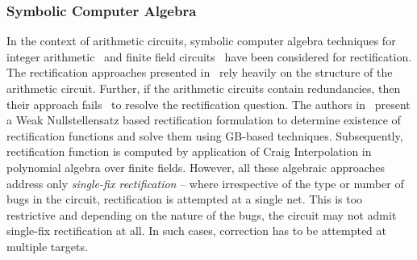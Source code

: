 \subsubsection{Symbolic Computer Algebra}
{\red
In the context of arithmetic circuits, symbolic computer algebra 
techniques for integer arithmetic~\cite{farimah:2016:1,farimah:2017:1,
MF_Rolf:ISVLSI18} and finite field circuits~\cite{Utkarsh:ETS19,
Utkarsh:VLSI18,Vkrao:FMCAD18} have been considered for rectification. 
The rectification approaches presented in~\cite{farimah:2016:1,farimah:2017:1} 
rely heavily on the structure of the arithmetic circuit. Further,
if the arithmetic circuits contain redundancies, then their approach 
fails~\cite{farimah_cex} to resolve the rectification question. 
The authors in~\cite{Utkarsh:ETS19,Utkarsh:VLSI18} present a Weak 
Nullstellensatz based rectification formulation to determine existence 
of rectification functions and solve them using GB-based techniques. 
Subsequently, rectification function is computed by application of 
Craig Interpolation in polynomial algebra over finite fields. 
However, all these algebraic approaches address only {\it single-fix 
rectification} -- where irrespective of the type or number of bugs 
in the circuit, rectification is attempted at a single net. This is 
too restrictive and depending on the nature of the bugs, the circuit 
may not admit single-fix rectification at all. In such cases, 
correction has to be attempted at multiple targets.

}
